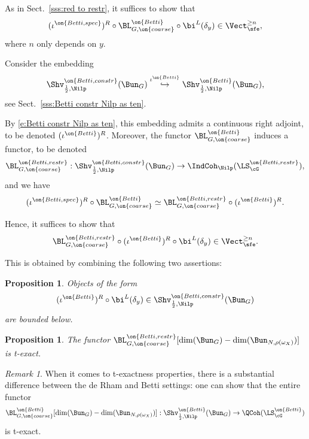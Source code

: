 \documentclass[9pt]{amsart}
\newtheorem{prop}[subsubsection]{Proposition}
\theoremstyle{remark}
\newtheorem{rem}[subsubsection]{Remark}
\theoremstyle{definition}
\theoremstyle{remark}
\newcommand{\secref}[1]{Sect.~\ref{#1}}
\numberwithin{equation}{section}
\begin{document}
As in \secref{sss:red to restr}, it suffices to show that 
$$(\iota^{\on{Betti,spec}})^R\circ \BL^{\on{Betti}}_{G,\on{coarse}}\circ \bi^L(\delta_y)\in \Vect_\sfe^{\geq n},$$
where $n$ only depends on $y$. 

\sssec{}

Consider the embedding 
$$\Shv^{\on{Betti,constr}}_{\frac{1}{2},\Nilp}(\Bun_G)\overset{\iota^{\on{Betti}}}\hookrightarrow 
\Shv^{\on{Betti}}_{\frac{1}{2},\Nilp}(\Bun_G),$$
see \secref{sss:Betti constr Nilp as ten}. 

\medskip

By \eqref{e:Betti constr Nilp as ten}, this embedding admits a continuous right adjoint, to be denoted 
$(\iota^{\on{Betti}})^R$. Moreover, the functor $\BL^{\on{Betti}}_{G,\on{coarse}}$ induces a functor, to be denoted
$$\BL_{G,\on{coarse}}^{\on{Betti,restr}}:\Shv^{\on{Betti,constr}}_{\frac{1}{2},\Nilp}(\Bun_G)\to \IndCoh_\Nilp(\LS^{\on{Betti,restr}}_\cG),$$
and we have
$$(\iota^{\on{Betti,spec}})^R\circ \BL^{\on{Betti}}_{G,\on{coarse}} \simeq \BL_{G,\on{coarse}}^{\on{Betti,restr}}\circ (\iota^{\on{Betti}})^R.$$
 
Hence, it suffices to show that
$$\BL_{G,\on{coarse}}^{\on{Betti,restr}}\circ (\iota^{\on{Betti}})^R\circ \bi^L(\delta_y)\in \Vect_\sfe^{\geq n}.$$

\medskip

This is obtained by combining the following two assertions:

\begin{prop} \label{p:delta funs}
Objects of the form 
$$(\iota^{\on{Betti}})^R\circ \bi^L(\delta_y)\in \Shv^{\on{Betti,constr}}_{\frac{1}{2},\Nilp}(\Bun_G)$$
are bounded below. 
\end{prop}

\begin{prop} \label{p:L coarse left exact Nilp Betti}
The functor $\BL_{G,\on{coarse}}^{\on{Betti,restr}}[\dim(\Bun_G)-\dim(\Bun_{N,\rho(\omega_X)})]$ is t-exact.
\end{prop}

\begin{rem}
When it comes to t-exactness properties, there is a substantial difference between the de Rham and Betti
settings: one can show that the entire functor 
$$\BL_{G,\on{coarse}}^{\on{Betti}}[\dim(\Bun_G)-\dim(\Bun_{N,\rho(\omega_X)})]:
\Shv^{\on{Betti}}_{\frac{1}{2},\Nilp}(\Bun_G)\to \QCoh(\LS^{\on{Betti}}_\cG)$$
is t-exact.
\end{rem} 

\end{document}
